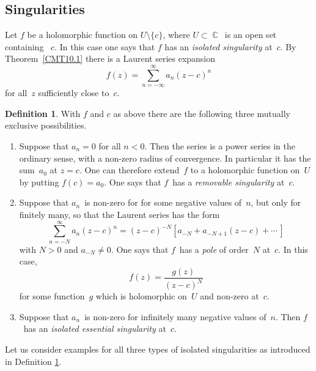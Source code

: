 \documentclass{amsproc}
\theoremstyle{definition}
\newtheorem{definition}[theorem]{Definition}
\theoremstyle{remark}
\DeclareMathOperator{\C}{\mathbb{C}}
\numberwithin{equation}{section}
\begin{document}
\vfill\pagebreak


\subsection{Singularities} \label{CMS11}

Let $ f $ be a holomorphic function on $ U \setminus \{c\} $, where $ U \subset \C $~is an open set containing ~$ c $. In this case one says that $ f $ has
an \emph{isolated singularity} at~$ c $. By Theorem~\ref{CMT10.1} there is a Laurent series expansion
$$
f(z) = \sum_{n = -\infty}^\infty a_n(z - c)^n
$$
for all~$ z $ sufficiently close to~$ c $.

\begin{definition} \label{CMD11.1}
With $ f $ and $ c $ as above there are the following three mutually exclusive possibilities.
\begin{enumerate}
\item Suppose that $ a_n = 0 $ for all $ n < 0 $. Then the series is a power series in the ordinary sense, with a non-zero radius of convergence. In particular it has the sum~$ a_0 $
at $ z = c $. One can therefore extend~$ f $ to a holomorphic function on~$ U $ by putting $ f(c) = a_0 $. One says that $ f $~has a \emph{removable singularity} at~$ c $.
\item Suppose that $ a_n $~is non-zero for for some negative values of~$ n $, but only for finitely many, so that the Laurent series has the form
$$
\sum_{n = -N}^\infty a_n(z - c)^n = (z - c)^{-N}[a_{-N} + a_{-N + 1}(z - c) + \cdots\,]
$$
with $ N > 0 $ and $ a_{-N} \neq 0 $. One says that $ f $~has a \emph{pole} of order~$ N $ at~$ c $. In this case,
$$
f(z) = \dfrac{g(z)}{(z - c)^N}
$$
for some function~$ g $ which is holomorphic on~$ U $ and non-zero at~$ c $.
\item Suppose that $ a_n $~is non-zero for infinitely many negative values of~$ n $. Then $ f $~has an \emph{isolated essential singularity} at~$ c $.
\end{enumerate}
\end{definition}

Let us consider examples for all three types of isolated singularities as introduced in Definition \ref{CMD11.1}.
\end{document}
